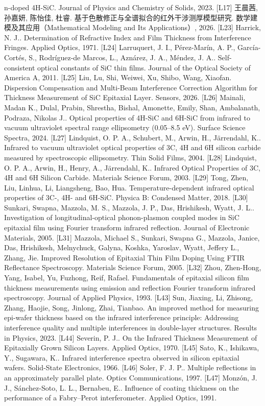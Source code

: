 n-doped 4H-SiC. Journal of Physics and Chemistry of Solids, 2023.
{[}L17{]} 王晨茜, 孙嘉妍, 陈怡佳, 杜睿.
基于色散修正与全谱拟合的红外干涉测厚模型研究.
数学建模及其应用（Mathematical Modeling and Its Applications）, 2026.
{[}L23{]} Harrick, N. J.. Determination of Refractive Index and Film
Thickness from Interference Fringes. Applied Optics, 1971. {[}L24{]}
Larruquert, J. I., Pérez-Marín, A. P., García-Cortés, S., Rodríguez-de
Marcos, L., Aznárez, J. A., Méndez, J. A.. Self-consistent optical
constants of SiC thin films. Journal of the Optical Society of America
A, 2011. {[}L25{]} Liu, Lu, Shi, Weiwei, Xu, Shibo, Wang, Xiaofan.
Dispersion Compensation and Multi-Beam Interference Correction Algorithm
for Thickness Measurement of SiC Epitaxial Layer. Sensors, 2026.
{[}L26{]} Mainali, Madan K., Dulal, Prabin, Shrestha, Bishal, Amonette,
Emily, Shan, Ambalanath, Podraza, Nikolas J.. Optical properties of
4H-SiC and 6H-SiC from infrared to vacuum ultraviolet spectral range
ellipsometry (0.05--8.5 eV). Surface Science Spectra, 2024. {[}L27{]}
Lindquist, O. P. A., Schubert, M., Arwin, H., Järrendahl, K.. Infrared
to vacuum ultraviolet optical properties of 3C, 4H and 6H silicon
carbide measured by spectroscopic ellipsometry. Thin Solid Films, 2004.
{[}L28{]} Lindquist, O. P. A., Arwin, H., Henry, A., Järrendahl, K..
Infrared Optical Properties of 3C, 4H and 6H Silicon Carbide. Materials
Science Forum, 2003. {[}L29{]} Tong, Zhen, Liu, Linhua, Li, Liangsheng,
Bao, Hua. Temperature-dependent infrared optical properties of 3C-, 4H-
and 6H-SiC. Physica B: Condensed Matter, 2018. {[}L30{]} Sunkari,
Swapna, Mazzola, M. S., Mazzola, J. P., Das, Hrishikesh, Wyatt, J. L..
Investigation of longitudinal-optical phonon-plasmon coupled modes in
SiC epitaxial film using Fourier transform infrared reflection. Journal
of Electronic Materials, 2005. {[}L31{]} Mazzola, Michael S., Sunkari,
Swapna G., Mazzola, Janice, Das, Hrishikesh, Melnychuck, Galyna, Koshka,
Yaroslav, Wyatt, Jeffery L., Zhang, Jie. Improved Resolution of
Epitaxial Thin Film Doping Using FTIR Reflectance Spectroscopy.
Materials Science Forum, 2005. {[}L32{]} Zhou, Zhen-Hong, Yang, Isabel,
Yu, Fuzhong, Reif, Rafael. Fundamentals of epitaxial silicon film
thickness measurements using emission and reflection Fourier transform
infrared spectroscopy. Journal of Applied Physics, 1993. {[}L43{]} Sun,
Jiaxing, Li, Zhisong, Zhang, Haojie, Song, Jinlong, Zhai, Tianbao. An
improved method for measuring epi-wafer thickness based on the infrared
interference principle: Addressing interference quality and multiple
interferences in double-layer structures. Results in Physics, 2023.
{[}L44{]} Severin, P. J.. On the Infrared Thickness Measurement of
Epitaxially Grown Silicon Layers. Applied Optics, 1970. {[}L45{]} Sato,
K., Ishikawa, Y., Sugawara, K.. Infrared interference spectra observed
in silicon epitaxial wafers. Solid-State Electronics, 1966. {[}L46{]}
Soler, F. J. P.. Multiple reflections in an approximately parallel
plate. Optics Communications, 1997. {[}L47{]} Monzón, J. J.,
Sánchez-Soto, L. L., Bernabeu, E.. Influence of coating thickness on the
performance of a Fabry--Perot interferometer. Applied Optics, 1991.

